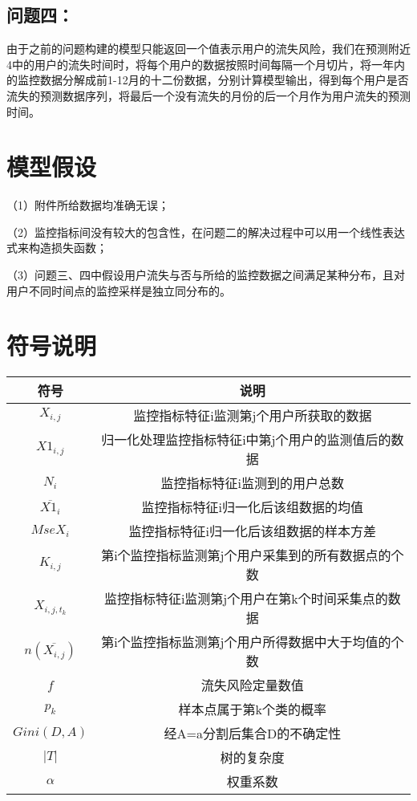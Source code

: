 \documentclass{ctexart}
\begin{document}
        \subsection{问题四：} 由于之前的问题构建的模型只能返回一个值表示用户的流失风险，我们在预测附近4中的用户的流失时间时，将每个用户的数据按照时间每隔一个月切片，将一年内的监控数据分解成前1-12月的十二份数据，分别计算模型输出，得到每个用户是否流失的预测数据序列，将最后一个没有流失的月份的后一个月作为用户流失的预测时间。


    \section{模型假设}
    （1）附件所给数据均准确无误；

    （2）监控指标间没有较大的包含性，在问题二的解决过程中可以用一个线性表达式来构造损失函数；

    （3）问题三、四中假设用户流失与否与所给的监控数据之间满足某种分布，且对用户不同时间点的监控采样是独立同分布的。

    \section{符号说明}
    \begin{center}
        \begin{tabular}{|c|c|}
            \hline
            符号&说明\\
            \hline
            $X_{i,j}$&监控指标特征i监测第j个用户所获取的数据\\
            \hline
            $X1_{i,j}$&归一化处理监控指标特征i中第j个用户的监测值后的数据\\
            \hline
            $N_i$&监控指标特征i监测到的用户总数\\
            \hline
            $\overline{X1_{i}}$&监控指标特征i归一化后该组数据的均值\\
            \hline
            $MseX_i$&监控指标特征i归一化后该组数据的样本方差\\
            \hline
            $K_{i,j}$&第i个监控指标监测第j个用户采集到的所有数据点的个数\\
            \hline
            $X_{i,j,t_k}$&监控指标特征i监测第j个用户在第k个时间采集点的数据\\
            \hline
            $n(\overline{X_{i,j}})$&第i个监控指标监测第j个用户所得数据中大于均值的个数\\
            \hline
            $f$&流失风险定量数值\\
            \hline
            $p_k$&样本点属于第k个类的概率\\
            \hline
            $Gini(D,A)$&经A=a分割后集合D的不确定性\\
            \hline
            $|T|$&树的复杂度\\
            \hline
            $\alpha$&权重系数\\

            \hline
        \end{tabular}\\
    \end{center}
\end{document}

